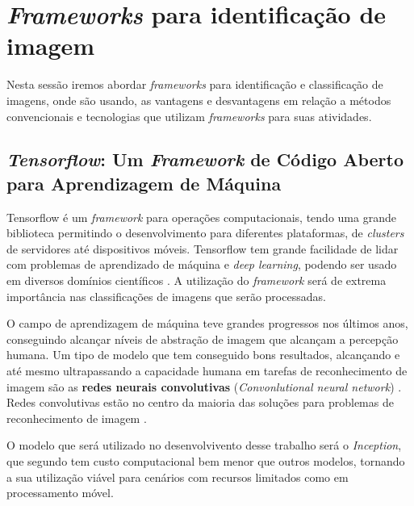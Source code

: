 \section{\textit{Frameworks} para identificação de imagem}

Nesta sessão iremos abordar \textit{frameworks} para identificação e classificação de imagens, onde são usando, as vantagens e desvantagens em  relação a métodos convencionais e tecnologias que utilizam \textit{frameworks} para suas atividades. %


\subsection{\textit{Tensorflow}: Um \textit{Framework} de Código Aberto para Aprendizagem de Máquina}

Tensorflow é um \textit{framework} para operações computacionais, tendo uma grande biblioteca permitindo o desenvolvimento para diferentes plataformas, de \textit{clusters} de servidores até dispositivos móveis. Tensorflow tem grande facilidade de lidar com problemas de aprendizado de máquina e \textit{deep learning}, podendo ser usado em diversos domínios científicos \cite{tensorflow2015}. A utilização do \textit{framework} será de extrema importância nas classificações de imagens que serão processadas.

O campo de aprendizagem de máquina teve grandes progressos nos últimos anos, conseguindo alcançar níveis de abstração de imagem que alcançam a percepção humana. Um tipo de modelo que tem conseguido bons resultados, alcançando e até mesmo ultrapassando a capacidade humana em tarefas de reconhecimento de imagem são as \textbf{redes neurais convolutivas} (\textit{Convonlutional neural network}) \cite{Tensorflow2018}. Redes convolutivas estão no centro da maioria das soluções para problemas de reconhecimento de imagem \cite{SzegedyVISW15}.

O modelo que será utilizado no desenvolvivento desse trabalho será o \textit{Inception}, que segundo  tem custo computacional bem menor que outros modelos, tornando a sua utilização viável para cenários com recursos limitados como em processamento móvel.

